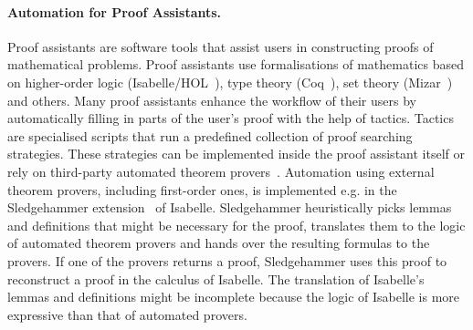 \paragraph{Automation for Proof Assistants.}
Proof assistants are software tools that assist users in constructing proofs of mathematical problems. Proof assistants use formalisations of mathematics based on higher-order logic (Isabelle/HOL~\cite{Isabelle}), type theory (Coq~\cite{Coq}), set theory (Mizar~\cite{Mizar}) and others. Many proof assistants enhance the workflow of their users by automatically filling in parts of the user's proof with the help of tactics. Tactics are specialised scripts that run a predefined collection of proof searching strategies. These strategies can be implemented inside the proof assistant itself or rely on third-party automated theorem provers~\cite{Sledgehammer,DBLP:conf/icms/UrbanHV10}. Automation using external theorem provers, including first-order ones, is implemented e.g. in the Sledgehammer extension~\cite{Sledgehammer} of Isabelle. Sledgehammer heuristically picks lemmas and definitions that might be necessary for the proof, translates them to the logic of automated theorem provers and hands over the resulting formulas to the provers. If one of the provers returns a proof, Sledgehammer uses this proof to reconstruct a proof in the calculus of Isabelle. The translation of Isabelle's lemmas and definitions might be incomplete because the logic of Isabelle is more expressive than that of automated provers.

